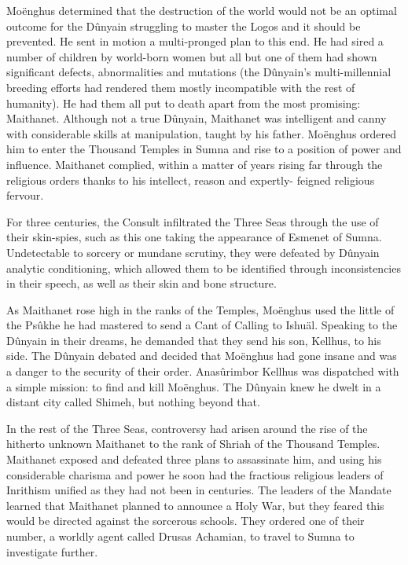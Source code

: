 \documentclass[]{book}
\begin{document}
Moënghus determined that the destruction of the world would not be an optimal
outcome for the Dûnyain struggling to master the Logos and it should be prevented.
He sent in motion a multi-pronged plan to this end. He had sired a number of children
by world-born women but all but one of them had shown significant defects,
abnormalities and mutations (the Dûnyain's multi-millennial breeding efforts had
rendered them mostly incompatible with the rest of humanity). He had them all put to
death apart from the most promising: Maithanet. Although not a true Dûnyain,
Maithanet was intelligent and canny with considerable skills at manipulation, taught by
his father. Moënghus ordered him to enter the Thousand Temples in Sumna and rise
to a position of power and influence. Maithanet complied, within a matter of years
rising far through the religious orders thanks to his intellect, reason and expertly-
feigned religious fervour.

For three centuries, the Consult infiltrated the Three Seas through the use of their skin-spies, such as this one taking the appearance of Esmenet of Sumna. Undetectable to sorcery or mundane scrutiny, they
were defeated by Dûnyain analytic conditioning, which allowed them to be identified through
inconsistencies in their speech, as well as their skin and bone structure.

As Maithanet rose high in the ranks of the Temples, Moënghus used the little of the
Psûkhe he had mastered to send a Cant of Calling to Ishuäl. Speaking to the Dûnyain
in their dreams, he demanded that they send his son, Kellhus, to his side. The Dûnyain
debated and decided that Moënghus had gone insane and was a danger to the security
of their order. Anasûrimbor Kellhus was dispatched with a simple mission: to find and
kill Moënghus. The Dûnyain knew he dwelt in a distant city called Shimeh, but
nothing beyond that.

In the rest of the Three Seas, controversy had arisen around the rise of the hitherto
unknown Maithanet to the rank of Shriah of the Thousand Temples. Maithanet
exposed and defeated three plans to assassinate him, and using his considerable
charisma and power he soon had the fractious religious leaders of Inrithism unified as
they had not been in centuries. The leaders of the Mandate learned that Maithanet
planned to announce a Holy War, but they feared this would be directed against the
sorcerous schools. They ordered one of their number, a worldly agent called Drusas
Achamian, to travel to Sumna to investigate further.
\end{document}
